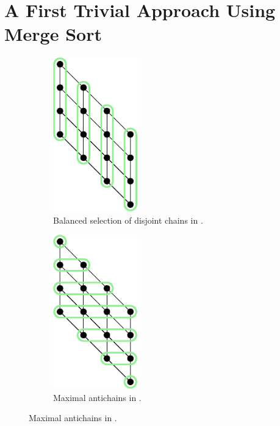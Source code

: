 \section{A First Trivial Approach Using Merge Sort}

\begin{figure}
\centering
\begin{subfigure}[b]{0.49\textwidth}
\centering
	\includegraphics[width=0.4\textwidth]{fig/x+y/poset/chains}
	\caption{Balanced selection of disjoint chains in \XY.}
	\label{fig:xy:poset:chains}
\end{subfigure}
\begin{subfigure}[b]{0.49\textwidth}
\centering
	\includegraphics[width=0.4\textwidth]{fig/x+y/poset/antichains}
	\caption{Maximal antichains in \XY.}
	\label{fig:xy:poset:antichains}
\end{subfigure}
\end{figure}

